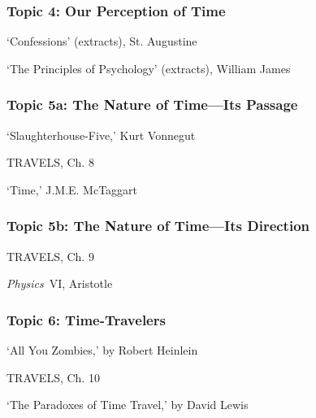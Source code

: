 \documentclass[oneside, 11pt]{article}
\begin{document}

\subsubsection*{Topic 4: Our Perception of Time}
\begin{enumerate*}
\item `Confessions' (extracts),  St. Augustine
\item `The Principles of Psychology' (extracts), William James
\end{enumerate*}

\subsubsection*{Topic 5a: The Nature of Time---Its Passage}

\begin{enumerate*}
\item `Slaughterhouse-Five,' Kurt Vonnegut
\item TRAVELS, Ch. 8
\item  `Time,' J.M.E. McTaggart
\end{enumerate*}



\subsubsection*{Topic 5b: The Nature of Time---Its Direction}

\begin{enumerate*}
\item TRAVELS, Ch. 9
\item \emph{Physics}\ VI, Aristotle
\end{enumerate*}


\subsubsection*{Topic 6: Time-Travelers}

\begin{enumerate*}
\item `All You Zombies,' by Robert Heinlein
\item TRAVELS, Ch. 10 
\item `The Paradoxes of Time Travel,' by David Lewis
\end{enumerate*}
\end{document}
